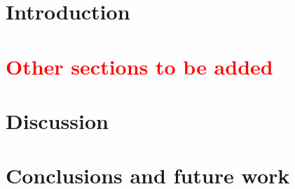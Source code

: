 \documentclass[3p,times,procedia]{elsarticle}
\begin{document}



\section{Introduction}\label{introduction}

\section{\textcolor{red}{Other sections to be added}}

\cite{2018_Tolstikhin}

\section{Discussion}\label{discussion}

\section{Conclusions and future work}\label{conclusions}



\footnotesize{




} 
\end{document}
